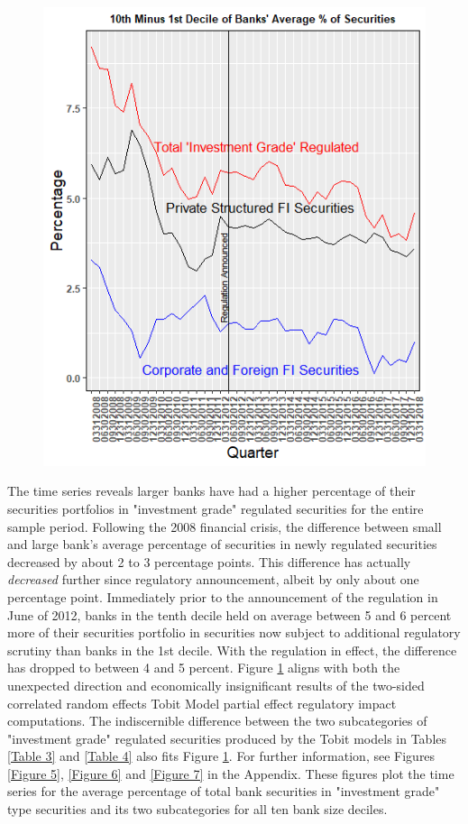 \documentclass[preprint,12pt]{elsarticle}
\begin{document}
\begin{figure}[h!]
\centering
\caption{}
\label{Figure 4}
\includegraphics[width = .7\linewidth]{Rplot07}
\end{figure}

The time series reveals larger banks have had a higher percentage of their securities portfolios in "investment grade" regulated securities for the entire sample period.  Following the 2008 financial crisis, the difference between small and large bank's average percentage of securities in newly regulated securities decreased by about 2 to 3 percentage points.  This difference has actually \textit{decreased} further since regulatory announcement, albeit by only about one percentage point.  Immediately prior to the announcement of the regulation in June of 2012, banks in the tenth decile held on average between 5 and 6 percent more of their securities portfolio in securities now subject to additional regulatory scrutiny than banks in the 1st decile.  With the regulation in effect, the difference has dropped to between 4 and 5 percent.  Figure \ref{Figure 4} aligns with both the unexpected direction and economically insignificant results of the two-sided correlated random effects Tobit Model partial effect regulatory impact computations.  The indiscernible difference between the two subcategories of "investment grade" regulated securities produced by the Tobit models in Tables \ref{Table 3} and \ref{Table 4} also fits Figure \ref{Figure 4}.  For further information, see Figures \ref{Figure 5}, \ref{Figure 6} and \ref{Figure 7} in the Appendix.  These figures plot the time series for the average percentage of total bank securities in "investment grade" type securities and its two subcategories for all ten bank size deciles.  
\end{document}
